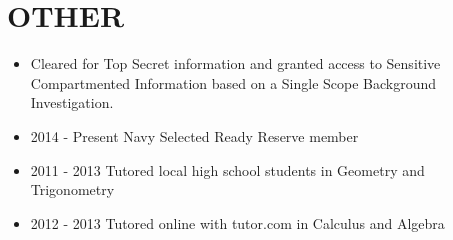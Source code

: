 \documentclass[10pt]{article}
\def\tightlist{}
\begin{document}
\hypertarget{other}{%
\section{OTHER}\label{other}}

\begin{itemize}
\tightlist
\item
  Cleared for Top Secret information and granted access to Sensitive
  Compartmented Information based on a Single Scope Background
  Investigation.
\item
  2014 - Present Navy Selected Ready Reserve member
\item
  2011 - 2013 Tutored local high school students in Geometry and
  Trigonometry
\item
  2012 - 2013 Tutored online with tutor.com in Calculus and Algebra
\end{itemize}

\end{document}
